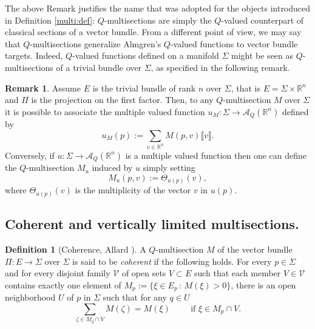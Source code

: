 \documentclass[a4paper,11pt,reqno]{amsart}
\theoremstyle{definition}
\newtheorem{definition}[theorem]{Definition}
\newtheorem{remark}[theorem]{Remark}
\numberwithin{equation}{section}
\numberwithin{subsection}{section}
\newcommand{\R}{\mathbb{R}}
\newcommand{\A}{\mathcal{A}}
\begin{document}
The above Remark justifies the name that was adopted for the objects introduced in Definition \ref{multi:def}: $Q$-multisections are simply the $Q$-valued counterpart of classical sections of a vector bundle. From a different point of view, we may say that $Q$-multisections generalize Almgren's $Q$-valued functions to vector bundle targets. Indeed, $Q$-valued functions defined on a manifold $\Sigma$ might be seen as $Q$-multisections of a trivial bundle over $\Sigma$, as specified in the following remark.

\begin{remark}
Assume $E$ is the trivial bundle of rank $n$ over $\Sigma$, that is $E = \Sigma \times \R^{n}$ and $\Pi$ is the projection on the first factor. Then, to any $Q$-multisection $M$ over $\Sigma$ it is possible to associate the multiple valued function $u_{M} \colon \Sigma \to \A_{Q}(\R^n)$ defined by 
\begin{equation} \label{Qfunct}
u_{M}(p) := \sum_{v \in \R^{n}} M(p,v) \llbracket v \rrbracket.
\end{equation}
Conversely, if $u \colon \Sigma \to \A_{Q}(\R^{n})$ is a multiple valued function then one can define the $Q$-multisection $M_{u}$ induced by $u$ simply setting
\begin{equation} \label{induced_multi}
M_{u}(p,v) := \Theta_{u(p)}(v), 
\end{equation}
where $\Theta_{u(p)}(v)$ is the multiplicity of the vector $v$ in $u(p)$.
\end{remark}

\subsection{Coherent and vertically limited multisections.} 

\begin{definition}[Coherence, Allard {\cite{Allard}}] \label{Coherence}
A $Q$-multisection $M$ of the vector bundle $\Pi \colon E \to \Sigma$ over $\Sigma$ is said to be \emph{coherent} if the following holds. For every $p \in \Sigma$ and for every disjoint family $\mathcal{V}$ of open sets $V \subset E$ such that each member $V \in \mathcal{V}$ contains exactly one element of ${M_{p} := \lbrace \xi \in E_{p} \, \colon \, M(\xi) > 0 \rbrace}$, there is an open neighborhood $U$ of $p$ in $\Sigma$ such that for any $q \in U$
\begin{equation} \label{Coherence:eq}
\sum_{\zeta \in M_{q} \cap V} M(\zeta) = M(\xi) \hspace{1cm} \mbox{if } \xi \in M_{p} \cap V .
\end{equation} 
\end{definition}
\end{document}
